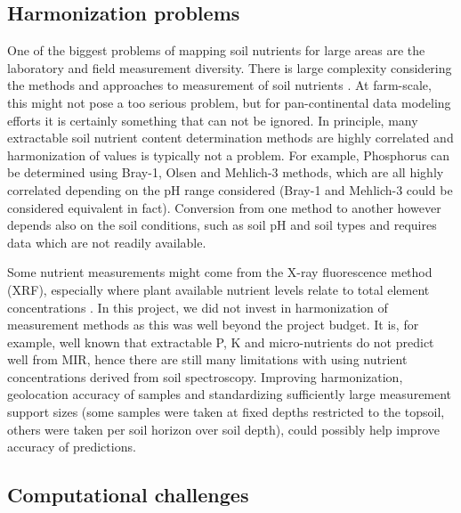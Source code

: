 \begin{linenumbers}
\subsection{Harmonization problems}

One of the biggest problems of mapping soil nutrients for large areas are the laboratory and field measurement diversity. There is large complexity considering the methods and approaches to measurement of soil nutrients \citep{barber1995soil}. At farm-scale, this might not pose a too serious problem, but for pan-continental data modeling efforts it is certainly something that can not be ignored. In principle, many extractable soil nutrient content determination methods are highly correlated and harmonization of values is typically not a problem. For example, Phosphorus can be determined using Bray-1, Olsen and Mehlich-3 methods, which are all highly correlated depending on the pH range considered (Bray-1 and Mehlich-3 could be considered equivalent in fact). Conversion from one method to another however depends also on the soil conditions, such as soil pH and soil types \citep{roy2006plant} and requires data which are not readily available.\par 

Some nutrient measurements might come from the X-ray fluorescence method (XRF), especially where plant available nutrient levels relate to total element concentrations \citep{towett2015total}. In this project, we did not invest in harmonization of measurement methods as this was well beyond the project budget. It is, for example, well known that extractable P, K and micro-nutrients do not predict well from MIR, hence there are still many limitations with using nutrient concentrations derived from soil spectroscopy. Improving harmonization, geolocation accuracy of samples and standardizing sufficiently large measurement support sizes (some samples were taken at fixed depths restricted to the topsoil, others were taken per soil horizon over soil depth), could possibly help improve accuracy of predictions. \par 

\subsection{Computational challenges}


\end{linenumbers}
